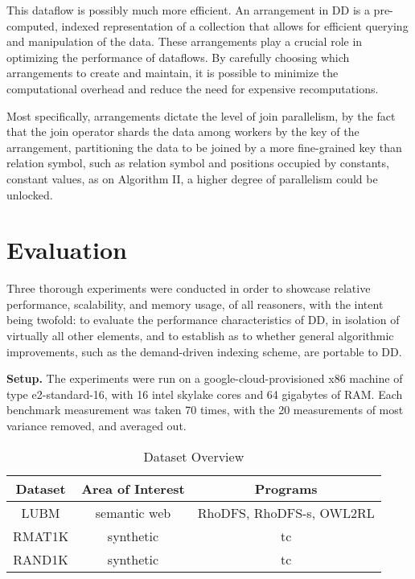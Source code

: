 \documentclass[sigconf,screen,review=false,natbib]{acmart}
\theoremstyle{definition}
\begin{document}
This dataflow is possibly much more efficient. An arrangement in DD is a pre-computed, indexed representation of a collection that allows
for efficient querying and manipulation of the data. These arrangements play a crucial role in optimizing the performance of dataflows. By carefully choosing
which arrangements to create and maintain, it is possible to minimize the computational overhead and reduce the need for expensive recomputations.

Most specifically, arrangements dictate the level of join parallelism, by the fact that the join operator shards the data among workers by the key of
the arrangement, partitioning the data to be joined by a more fine-grained key than relation symbol, such as relation symbol and positions occupied by constants,
constant values, as on Algorithm II, a higher degree of parallelism could be unlocked.
\section{Evaluation}
Three thorough experiments were conducted in order to showcase relative performance, scalability, and memory usage, of all reasoners, with the intent being twofold:
to evaluate the performance characteristics of DD, in isolation of virtually all other elements, and to establish as to whether general algorithmic
improvements, such as the demand-driven indexing scheme, are portable to DD.

\textbf{Setup.} The experiments were run on a google-cloud-provisioned x86 machine of type e2-standard-16, with 16 intel skylake cores and 64 gigabytes of RAM. Each
benchmark measurement was taken 70 times, with the 20 measurements of most variance removed, and averaged out.
\begin{table}
	\caption{Dataset Overview}
	\begin{tabular}{|c|c|c|}
		\hline
		Dataset & Area of Interest & Programs                 \\
		\hline
		LUBM    & semantic web     & RhoDFS, RhoDFS-s, OWL2RL \\
		\hline
		RMAT1K  & synthetic        & tc                       \\
		\hline
		RAND1K  & synthetic        & tc                       \\
		\hline
	\end{tabular}
	\label{tab:datasets}
\end{table}
\end{document}
